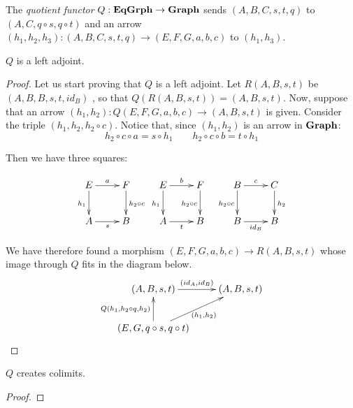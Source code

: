 \begin{definition}
The \emph{quotient functor} $Q:\mathbf{EqGrph}\to \mathbf{Graph} $ sends $(A, B, C, s,t, q)$ to $(A, C, q\circ s, q\circ t)$ and an arrow $(h_1, h_2, h_3) \colon (A, B, C, s,t, q)\to (E, F, G, a,b, c)$ to $(h_1, h_3)$.
\end{definition}


\begin{lemma}
	$Q$ is a left  adjoint.
\end{lemma}
\begin{proof} Let us start proving that $Q$ is a left adjoint. Let $R(A,B, s, t)$ be $(A, B, B, s,t, id_{B})$ , so that $Q(R(A,B,s,t))=(A,B,s,t)$. Now, suppose that an arrow $(h_1, h_2)\colon Q(E,F,G, a,b,c)\to (A,B, s,t)$ is given. Consider the triple $(h_1, h_2, h_2\circ c)$. Notice that, since $(h_1, h_2)$ is an arrow in $\mathbf{Graph}$:
	\[h_2\circ c\circ a= s\circ h_1 \qquad  h_2\circ c\circ b= t\circ h_1\]
	
	 Then we have three squares:	
	

\[\xymatrix{E \ar[r]^{a} \ar[d]_{h_1} & F \ar[d]^{h_2\circ c} & E \ar[r]^{b} \ar[d]_{h_1}& F \ar[d]_{h_2\circ c} & B \ar[d]_{h_2\circ c} \ar[r]^{c} & C \ar[d]^{h_2}\\A \ar[r]_{s} & B & A  \ar[r]_{t}& B & B \ar[r]_{id_B} & B}\]
	
	 We have therefore found a morphism $(E,F,G, a,b,c)\to R(A,B,s,t)$ whose image through $Q$ fits in the diagram below.
	\[\xymatrix{(A, B, s,t)\ar[r]^{(id_A, id_B)} &(A, B, s,t)\\ (E, G, q\circ s, q\circ t) \ar[ur]_{(h_1, h_2)} \ar[u]^{Q(h_1, h_2\circ q, h_2)}}\]
	
\end{proof}



\begin{prop}\label{prop:colimit}
	$Q$ creates colimits.
\end{prop}
\begin{proof}
\end{proof}

\begin{example}
\end{example}

